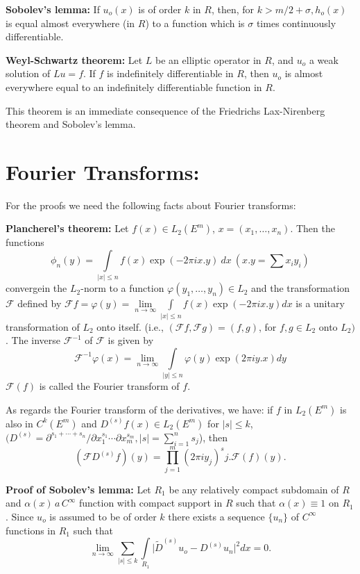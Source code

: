 \noindent \textbf{Sobolev's lemma:} 
If $u_o (x)$ is of order $k$ in $R$, then, for $k > m/2 + \sigma, h_o
(x)$ is equal almost everywhere (in $R$) to a function which is
$\sigma$ times continuously differentiable. 

\noindent \textbf{Weyl-Schwartz theorem:}
Let $L$ be an elliptic operator in $R$, and $u_o$ a weak solution of
$Lu = f$. If $f$ is indefinitely differentiable in $R$, then $u_o$ is
almost everywhere equal to an indefinitely differentiable function in
$R$. 

This theorem is an immediate consequence of the Friedrichs
Lax-Nirenberg theorem and Sobolev's lemma. 

\section{Fourier Transforms:}\label{chap13:sec4}

For the proofs we need the following facts about Fourier transforms:

\noindent \textbf{Plancherel's theorem:} 
Let $f(x) \in L_2 (E^m)$, $x = (x_1, \ldots, x_n)$. Then the functions 
$$
\phi_n (y) = \int\limits_{| x | \le n} f(x) \exp (-2 \pi i x. y) ~ dx~
(x.y = \sum x_i y_i) 
$$
converge\pageoriginale in the $L_2$-norm to a function $\varphi (y_1, \ldots, y_n)
\in L_2$ and the transformation $\mathscr{F}$ defined by $\mathscr{F}
f = \varphi (y) = \lim\limits_{n \to \infty} \int\limits_{| x | \le n}
f(x) \exp (-2 \pi ix . y) dx$ is a unitary transformation of $L_2$
onto itself. (i.e., $ (\mathscr{F} f, \mathscr{F} g) = (f, g)$, for
$f, g \in L_2$ onto $L_2)$. The inverse $\mathscr{F}^{-1} $ of
$\mathscr{F}$ is given by 
$$
\mathscr{F}^{-1} \varphi (x) = \lim_{n \to \infty} \int\limits_{| y |
 \le n} \varphi (y) \exp (2 \pi i y. x ) dy 
$$
$\mathscr{F}(f)$ is called the Fourier transform of $f$.

As regards the Fourier transform of the derivatives, we have: if $f$
in $L_2(E^m)$ is also in $C^k (E^m)$ and $D^{(s)} f(x) \in L_2 (E^m)$
for $| s | \le k$, $(D^{(s)} = \partial^{s_1 + \cdots + s_n}/
\partial x_1^{s_1} \cdots \partial x_m^{s_m}, | s | = \sum^n_{i = 1}
s_j$), then 
$$
(\mathscr{F} D^{(s)} f) (y) = \prod^m_{j = 1} (2 \pi i y_j)^s
j. \mathscr{F} (f) (y). 
$$

\noindent \textbf{Proof of Sobolev's lemma:}
Let $R_1$ be any relatively compact subdomain of $R$ and $\alpha (x)\, a\,
C^\infty$ function with compact support in $R$ such that $\alpha (x)
\equiv 1$ on $R_1$. Since $u_o$ is assumed to be of order $k$ there
exists a sequence $\{u_n\}$ of $C^\infty$ functions in $R_1$ such that 
$$
\lim_{n \to \infty} \sum_{| s | \le k} \int\limits_{R_1} \big |
\tilde{D}^{(s)} u_o - D^{(s) } u_n \big |^2 dx = 0. 
$$

